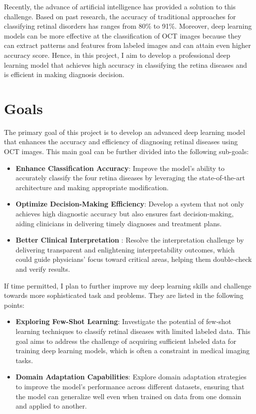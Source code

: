 \documentclass[a4paper,12pt]{article}
\begin{document}
Recently, the advance of artificial intelligence has provided a solution to this challenge. Based on past research, the accuracy of traditional approaches for classifying retinal disorders has ranges from 80\% to 91\%. Moreover, deep learning models can be more effective at the classification of OCT images because they can extract patterns and features from labeled images and can attain even higher accuracy score. Hence, in this project, I aim to develop a professional deep learning model that achieves high accuracy in classifying the retina diseases and is efficient in making diagnosis decision.



\section*{Goals}

The primary goal of this project is to develop an advanced deep learning model that enhances the accuracy and efficiency of diagnosing retinal diseases using OCT images. This main goal can be further divided into the following sub-goals:

\begin{itemize}
    \item \textbf{Enhance Classification Accuracy}: Improve the model's ability to accurately classify the four retina diseases by leveraging the state-of-the-art architecture and making appropriate modification. 
    
    \item \textbf{Optimize Decision-Making Efficiency}: Develop a system that not only achieves high diagnostic accuracy but also ensures fast decision-making, aiding clinicians in delivering timely diagnoses and treatment plans.
    
    \item \textbf{Better Clinical Interpretation }: Resolve the interpretation challenge by delivering transparent and enlightening interpretability outcomes, which could guide physicians' focus toward critical areas, helping them double-check and verify results.
    
\end{itemize}

If time permitted, I plan to further improve my deep learning skills and challenge towards more sophisticated task and problems. They are listed in the following points:
\begin{itemize}
    \item \textbf{Exploring Few-Shot Learning}: Investigate the potential of few-shot learning techniques to classify retinal diseases with limited labeled data. This goal aims to address the challenge of acquiring sufficient labeled data for training deep learning models, which is often a constraint in medical imaging tasks.

    \item \textbf{Domain Adaptation Capabilities}: Explore domain adaptation strategies to improve the model's performance across different datasets, ensuring that the model can generalize well even when trained on data from one domain and applied to another.
\end{itemize}
\end{document}
